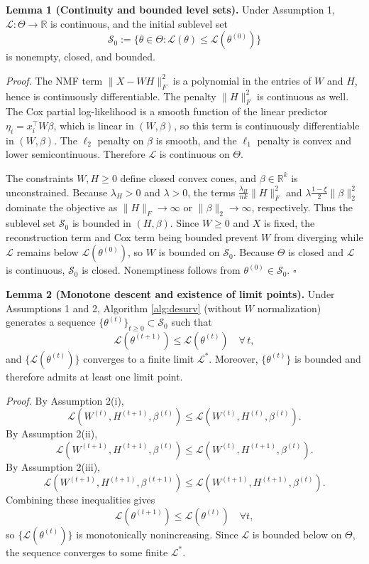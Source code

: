 \documentclass[
]{article}
\begin{document}
\vspace{0.5em}

\textbf{Lemma 1 (Continuity and bounded level sets).} Under Assumption
1, \(\mathcal{L}:\Theta\to\mathbb{R}\) is continuous, and the initial
sublevel set \[
  \mathcal{S}_0 := \{\theta \in \Theta:
    \mathcal{L}(\theta) \le \mathcal{L}(\theta^{(0)})\}
\] is nonempty, closed, and bounded.

\emph{Proof.} The NMF term \(\|X-WH\|_F^2\) is a polynomial in the
entries of \(W\) and \(H\), hence is continuously differentiable. The
penalty \(\|H\|_F^2\) is continuous as well. The Cox partial
log-likelihood is a smooth function of the linear predictor
\(\eta_i = x_i^\top W \beta\), which is linear in \((W,\beta)\), so this
term is continuously differentiable in \((W,\beta)\). The \(\ell_2\)
penalty on \(\beta\) is smooth, and the \(\ell_1\) penalty is convex and
lower semicontinuous. Therefore \(\mathcal{L}\) is continuous on
\(\Theta\).

The constraints \(W,H\ge 0\) define closed convex cones, and
\(\beta\in\mathbb{R}^k\) is unconstrained. Because \(\lambda_H>0\) and
\(\lambda>0\), the terms \(\tfrac{\lambda_H}{nk}\|H\|_F^2\) and
\(\lambda\tfrac{1-\xi}{2}\|\beta\|_2^2\) dominate the objective as
\(\|H\|_F\to\infty\) or \(\|\beta\|_2\to\infty\), respectively. Thus the
sublevel set \(\mathcal{S}_0\) is bounded in \((H,\beta)\). Since
\(W\ge 0\) and \(X\) is fixed, the reconstruction term and Cox term
being bounded prevent \(W\) from diverging while \(\mathcal{L}\) remains
below \(\mathcal{L}(\theta^{(0)})\), so \(W\) is bounded on
\(\mathcal{S}_0\). Because \(\Theta\) is closed and \(\mathcal{L}\) is
continuous, \(\mathcal{S}_0\) is closed. Nonemptiness follows from
\(\theta^{(0)}\in\mathcal{S}_0\). \hfill\(\square\)

\vspace{0.5em}

\textbf{Lemma 2 (Monotone descent and existence of limit points).} Under
Assumptions 1 and 2, Algorithm \ref{alg:desurv} (without \(W\)
normalization) generates a sequence
\(\{\theta^{(t)}\}_{t\ge 0}\subset\mathcal{S}_0\) such that \[
  \mathcal{L}(\theta^{(t+1)}) \le \mathcal{L}(\theta^{(t)})\quad \forall\,t,
\] and \(\{\mathcal{L}(\theta^{(t)})\}\) converges to a finite limit
\(\mathcal{L}^*\). Moreover, \(\{\theta^{(t)}\}\) is bounded and
therefore admits at least one limit point.

\emph{Proof.} By Assumption 2(i), \[
  \mathcal{L}(W^{(t)},H^{(t+1)},\beta^{(t)})
  \le
  \mathcal{L}(W^{(t)},H^{(t)},\beta^{(t)}).
\] By Assumption 2(ii), \[
  \mathcal{L}(W^{(t+1)},H^{(t+1)},\beta^{(t)})
  \le
  \mathcal{L}(W^{(t)},H^{(t+1)},\beta^{(t)}).
\] By Assumption 2(iii), \[
  \mathcal{L}(W^{(t+1)},H^{(t+1)},\beta^{(t+1)})
  \le
  \mathcal{L}(W^{(t+1)},H^{(t+1)},\beta^{(t)}).
\] Combining these inequalities gives \[
  \mathcal{L}(\theta^{(t+1)}) \le \mathcal{L}(\theta^{(t)})\quad\forall t,
\] so \(\{\mathcal{L}(\theta^{(t)})\}\) is monotonically nonincreasing.
Since \(\mathcal{L}\) is bounded below on \(\Theta\), the sequence
converges to some finite \(\mathcal{L}^*\).
\end{document}
